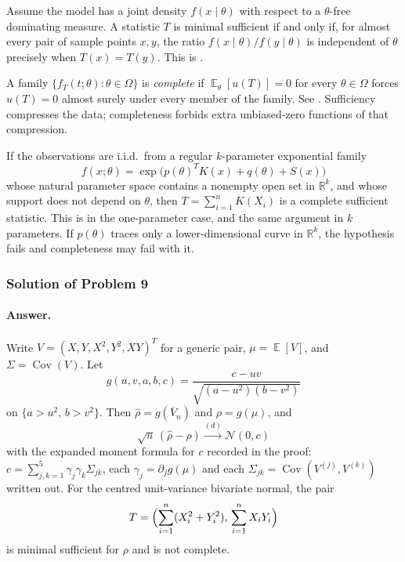 \documentclass[11pt,a4paper]{article}
\DeclareMathOperator{\E}{\mathbb{E}}
\begin{document}
\begin{theorem}
\label{thm:lehmann-scheffe-ratio}
Assume the model has a joint density \( f(x\mid\theta) \) with respect to a \( \theta \)-free dominating measure. A statistic \( T \) is minimal sufficient if and only if, for almost every pair of sample points \( x,y \), the ratio \( f(x\mid\theta)/f(y\mid\theta) \) is independent of \( \theta \) precisely when \( T(x)=T(y) \). This is \citep[Theorem~7.3.1]{hogg2019}.
\end{theorem}

\begin{definition}[Completeness]
\label{def:complete}
A family \( \{f_T(t;\theta):\theta\in\Omega\} \) is \emph{complete} if \( \E_\theta[u(T)]=0 \) for every \( \theta\in\Omega \) forces \( u(T)=0 \) almost surely under every member of the family. See \citep[\S7.4]{hogg2019}. Sufficiency compresses the data; completeness forbids extra unbiased-zero functions of that compression.
\end{definition}

\begin{theorem}
\label{thm:expfam-complete}
If the observations are i.i.d.\ from a regular \( k \)-parameter exponential family
\[
f(x;\theta)
=
\exp\bigl(p(\theta)^{T}K(x)+q(\theta)+S(x)\bigr)
\]
whose natural parameter space contains a nonempty open set in \( \mathbb{R}^{k} \), and whose support does not depend on \( \theta \), then \( T=\sum_{i=1}^{n}K(X_i) \) is a complete sufficient statistic. This is \citep[Theorems~7.5.1--7.5.2]{hogg2019} in the one-parameter case, and the same argument in \( k \) parameters. If \( p(\theta) \) traces only a lower-dimensional curve in \( \mathbb{R}^{k} \), the hypothesis fails and completeness may fail with it.
\end{theorem}

\subsubsection{Solution of Problem 9}

\paragraph{Answer.}
Write \( V=(X,Y,X^{2},Y^{2},XY)^{T} \) for a generic pair, \( \mu=\E[V] \), and \( \Sigma=\operatorname{Cov}(V) \). Let
\[
g(u,v,a,b,c)
=
\frac{c-uv}{\sqrt{(a-u^{2})(b-v^{2})}}
\]
on \( \{a>u^{2},\,b>v^{2}\} \). Then \( \hat{\rho}=g(\overline{V}_n) \) and \( \rho=g(\mu) \), and
\[
\sqrt{n}\,(\hat{\rho}-\rho)
\xrightarrow{(d)}
\mathcal{N}(0,c)
\]
with the expanded moment formula for \( c \) recorded in the proof: \( c=\sum_{j,k=1}^{5}\gamma_j\gamma_k\Sigma_{jk} \), each \( \gamma_j=\partial_j g(\mu) \) and each \( \Sigma_{jk}=\operatorname{Cov}(V^{(j)},V^{(k)}) \) written out. For the centred unit-variance bivariate normal, the pair
\[
T
=
\Bigl(\sum_{i=1}^{n}(X_i^{2}+Y_i^{2}),\,\sum_{i=1}^{n}X_i Y_i\Bigr)
\]
is minimal sufficient for \( \rho \) and is not complete.
\end{document}
